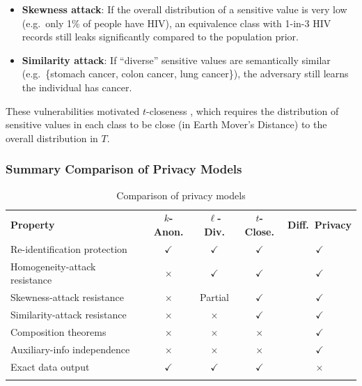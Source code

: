 \begin{itemize}
  \item \textbf{Skewness attack}: If the overall distribution of a sensitive value is very low (e.g.\ only 1\% of people have HIV), an equivalence class with 1-in-3 HIV records still leaks significantly compared to the population prior.
  \item \textbf{Similarity attack}: If ``diverse'' sensitive values are semantically similar (e.g.\ \{stomach cancer, colon cancer, lung cancer\}), the adversary still learns the individual has cancer.
\end{itemize}

These vulnerabilities motivated $t$-closeness \cite{li2007}, which requires the distribution of sensitive values in each class to be close (in Earth Mover's Distance) to the overall distribution in $T$.

\subsubsection{Summary Comparison of Privacy Models}
\label{sec:comparison_privacy_models}

\begin{table}
\caption{Comparison of privacy models}
\label{tab:compare_privacy}
\centering
\begin{tabular}{p{4cm}cccc}
\hline\noalign{\smallskip}
\textbf{Property} & \textbf{$k$-Anon.} & \textbf{$\ell$-Div.} & \textbf{$t$-Close.} & \textbf{Diff.\ Privacy}\\
\noalign{\smallskip}\svhline\noalign{\smallskip}
Re-identification protection & $\checkmark$ & $\checkmark$ & $\checkmark$ & $\checkmark$\\
Homogeneity-attack resistance & $\times$ & $\checkmark$ & $\checkmark$ & $\checkmark$\\
Skewness-attack resistance    & $\times$ & Partial & $\checkmark$ & $\checkmark$\\
Similarity-attack resistance  & $\times$ & $\times$ & $\checkmark$ & $\checkmark$\\
Composition theorems          & $\times$ & $\times$ & $\times$ & $\checkmark$\\
Auxiliary-info independence   & $\times$ & $\times$ & $\times$ & $\checkmark$\\
Exact data output             & $\checkmark$ & $\checkmark$ & $\checkmark$ & $\times$\\
\noalign{\smallskip}\hline\noalign{\smallskip}
\end{tabular}
\end{table}

